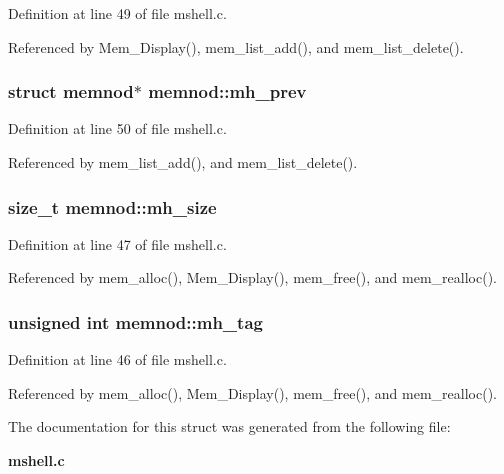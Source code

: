 Definition at line 49 of file mshell.c.

Referenced by Mem\_\-Display(), mem\_\-list\_\-add(), and mem\_\-list\_\-delete().
\subsubsection{\setlength{\rightskip}{0pt plus 5cm}struct memnod$\ast$ memnod::mh\_\-prev}\label{structmemnod_m3}




Definition at line 50 of file mshell.c.

Referenced by mem\_\-list\_\-add(), and mem\_\-list\_\-delete().
\subsubsection{\setlength{\rightskip}{0pt plus 5cm}size\_\-t memnod::mh\_\-size}\label{structmemnod_m1}




Definition at line 47 of file mshell.c.

Referenced by mem\_\-alloc(), Mem\_\-Display(), mem\_\-free(), and mem\_\-realloc().
\subsubsection{\setlength{\rightskip}{0pt plus 5cm}unsigned int memnod::mh\_\-tag}\label{structmemnod_m0}




Definition at line 46 of file mshell.c.

Referenced by mem\_\-alloc(), Mem\_\-Display(), mem\_\-free(), and mem\_\-realloc().

The documentation for this struct was generated from the following file:\begin{CompactItemize}
\item 
{\bf mshell.c}\end{CompactItemize}
